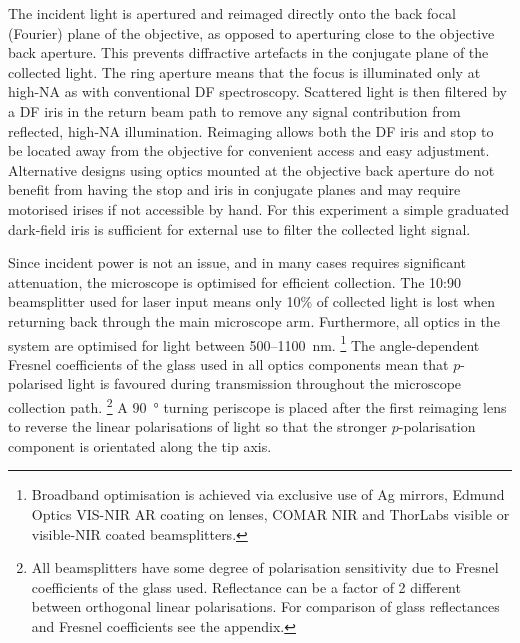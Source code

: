 \documentclass{article}
\begin{document}
The incident light is apertured and reimaged directly onto the back focal (Fourier) plane of the objective, as opposed to aperturing close to the objective back aperture. This prevents diffractive artefacts in the conjugate plane of the collected light. The ring aperture means that the focus is illuminated only at high-NA as with conventional DF spectroscopy. Scattered light is then filtered by a DF iris in the return beam path to remove any signal contribution from reflected, high-NA illumination. Reimaging allows both the DF iris and stop to be located away from the objective for convenient access and easy adjustment. Alternative designs using optics mounted at the objective back aperture do not benefit from having the stop and iris in conjugate planes and may require motorised irises if not accessible by hand. For this experiment a simple graduated dark-field iris is sufficient for external use to filter the collected light signal.

Since incident power is not an issue, and in many cases requires significant attenuation, the microscope is optimised for efficient collection. The 10:90 beamsplitter used for laser input means only 10\% of collected light is lost when returning back through the main microscope arm. Furthermore, all optics in the system are optimised for light between 500--\SI{1100}{nm}.%
\footnote{Broadband optimisation is achieved via exclusive use of Ag mirrors, Edmund Optics VIS-NIR AR coating on lenses, COMAR NIR and ThorLabs visible or visible-NIR coated beamsplitters.}
The angle-dependent Fresnel coefficients of the glass used in all optics components mean that $p$-polarised light is favoured during transmission throughout the microscope collection path.%
\footnote{All beamsplitters have some degree of polarisation sensitivity due to Fresnel coefficients of the glass used. Reflectance can be a factor of 2 different between orthogonal linear polarisations. For comparison of glass reflectances and Fresnel coefficients see the appendix.}
A \SI{90}{\degree} turning periscope is placed after the first reimaging lens to reverse the linear polarisations of light so that the stronger $p$-polarisation component is orientated along the tip axis.
\end{document}
